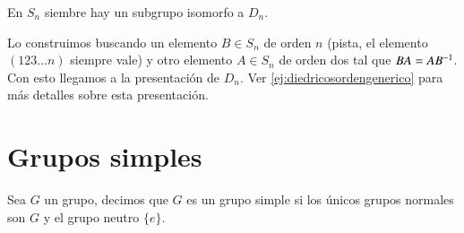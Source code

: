 \begin{obs}
	En $S_n$ siembre hay un subgrupo isomorfo a $D_n$.
	
	Lo construimos buscando un elemento $B \in S_n$ de orden $n$ (pista, el elemento $(123\dots n)$ siempre vale) y otro elemento $A \in S_n$ de orden dos tal que $BA = AB^{-1}$. Con esto llegamos a la presentación de $D_n$. Ver \autoref{ej:diedricosordengenerico} para más detalles sobre esta presentación.
\end{obs}

\section{Grupos simples}

\begin{dfn}
	\label{dfn:simple}
	Sea $G$ un grupo, decimos que $G$ es un grupo simple si los únicos grupos normales son $G$ y el grupo neutro $\{e\}.$
\end{dfn}

